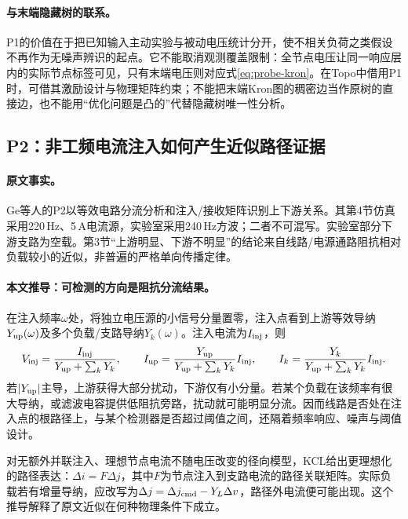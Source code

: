\paragraph{与末端隐藏树的联系。}
P1的价值在于把已知输入主动实验与被动电压统计分开，使不相关负荷之类假设不再作为无噪声辨识的起点。它不能取消观测覆盖限制：全节点电压让同一响应层内的实际节点标签可见，只有末端电压则对应式\eqref{eq:probe-kron}。在Topo中借用P1时，可借其激励设计与物理矩阵约束；不能把末端Kron图的稠密边当作原树的直接边，也不能用“优化问题是凸的”代替隐藏树唯一性分析。

\subsection{P2：非工频电流注入如何产生近似路径证据}
\label{subsec:P2}

\paragraph{原文事实。}
Ge等人的P2\citep{P2}以等效电路分流分析和注入/接收矩阵识别上下游关系。其第4节仿真采用220\,Hz、5\,A电流源，实验室采用240\,Hz方波；二者不可混写。实验室部分下游支路为空载。第3节“上游明显、下游不明显”的结论来自线路/电源通路阻抗相对负载较小的近似，非普遍的严格单向传播定律。

\paragraph{本文推导：可检测的方向是阻抗分流结果。}
在注入频率$\omega$处，将独立电压源的小信号分量置零，注入点看到上游等效导纳$Y_{\rm up}(\omega)$及多个负载/支路导纳$Y_k(\omega)$。注入电流为$I_{\rm inj}$，则
\begin{equation}
 V_{\rm inj}=\frac{I_{\rm inj}}{Y_{\rm up}+\sum_kY_k},\qquad
 I_{\rm up}=\frac{Y_{\rm up}}{Y_{\rm up}+\sum_kY_k}I_{\rm inj},\qquad
 I_k=\frac{Y_k}{Y_{\rm up}+\sum_kY_k}I_{\rm inj}.
 \label{eq:p2-current-split}
\end{equation}
若$|Y_{\rm up}|$主导，上游获得大部分扰动，下游仅有小分量。若某个负载在该频率有很大导纳，或滤波电容提供低阻抗旁路，扰动就可能明显分流。因而线路是否处在注入点的根路径上，与某个检测器是否超过阈值之间，还隔着频率响应、噪声与阈值设计。

对无额外并联注入、理想节点电流不随电压改变的径向模型，KCL给出更理想化的路径表达：$\Delta i=F\Delta j$，其中$F$为节点注入到支路电流的路径关联矩阵。实际负载若有增量导纳，应改写为$\Delta j=\Delta j_{\rm cmd}-Y_L\Delta v$，路径外电流便可能出现。这个推导解释了原文近似在何种物理条件下成立。

